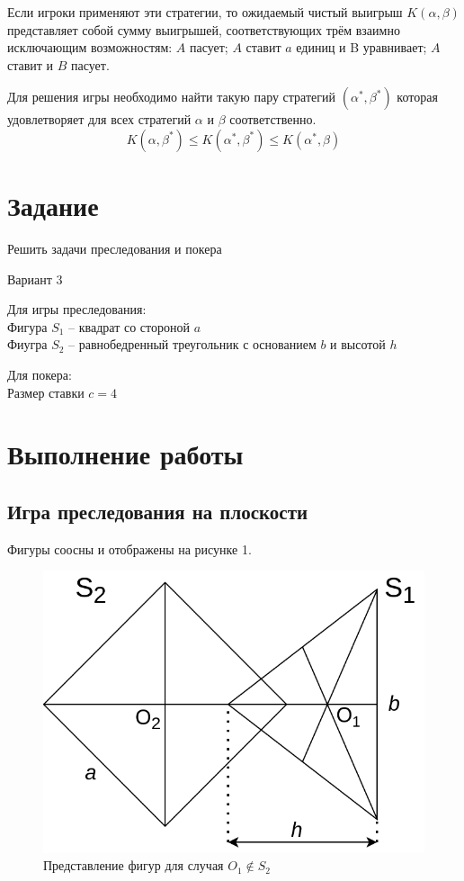 \documentclass[12pt,a4paper]{article}
\begin{document}
Если игроки применяют эти стратегии, то ожидаемый чистый выигрыш $K(\alpha, \beta)$
представляет собой сумму выигрышей, соответствующих трём взаимно исключающим
возможностям: $A$ пасует; $A$ ставит $a$ единиц и B уравнивает; $A$ ставит и $B$ пасует.

Для решения игры необходимо найти такую пару стратегий $(\alpha^*, \beta^*)$
которая удовлетворяет для всех стратегий $\alpha$ и $\beta$ соответственно.
$$ K(\alpha, \beta^*) \leq K(\alpha^*, \beta^*) \leq K(\alpha^*, \beta)$$

\section{Задание}
Решить задачи преследования и покера

Вариант 3

\vspace{.5cm}
Для игры преследования:\\
Фигура $S_1$ -- квадрат со стороной $a$\\
Фиугра $S_2$ -- равнобедренный треугольник с основанием $b$ и высотой $h$

\vspace{.5cm}
Для покера:\\
Размер ставки $c = 4$

\pagebreak
\section{Выполнение работы}
\subsection{Игра преследования на плоскости}

Фигуры соосны и отображены на рисунке 1.
\begin{figure}[ht]
  \centering
  \includegraphics[scale=0.4]{persuit.drawio.png}
  \caption{Представление фигур для случая $O_1 \notin S_2 $}
\end{figure}
\end{document}
